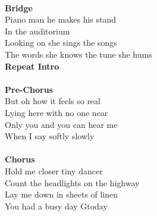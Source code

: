 \\
\textbf{Bridge}\\
Piano man he makes his stand\\
In the auditorium     \\
Looking on   she sings the songs\\
The words she knows the tune she hums         \\
\textbf{Repeat Intro}\\
\\
\textbf{Pre-Chorus}\\
But oh how it feels so real\\
Lying here with no one near\\
Only you and you can hear me\\
When I say softly slowly\\
\\
\textbf{Chorus}\\
Hold me closer tiny dancer      \\
Count the headlights on the highway       \\
Lay me down in sheets of linen       \\
You had a busy day Gtoday      

